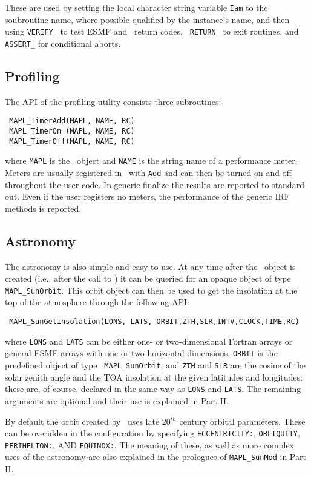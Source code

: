 These are used by setting the local character string variable {\tt Iam} to
the soubroutine name, where possible qualified by the instance's name,
and then using {\tt VERIFY\_} to test ESMF and \ggn\  return codes, {\tt
  RETURN\_} to exit routines, and {\tt  ASSERT\_} for conditional aborts. 

\subsection{Profiling}
The API of the profiling utility consists three subroutines:
\begin{verbatim}
 MAPL_TimerAdd(MAPL, NAME, RC)
 MAPL_TimerOn (MAPL, NAME, RC)
 MAPL_TimerOff(MAPL, NAME, RC)
\end{verbatim}
where {\tt MAPL} is the \ggn\  object and {\tt NAME} is the string
name of a performance meter. Meters are usually registered in \ssv\
with {\tt Add} and can then be turned on and off throughout the user
code. In generic finalize the results are reported to standard
out. Even if the user registers no meters, the performance of the
generic IRF methods is reported.

\subsection{Astronomy}
 The astronomy is also simple and easy to use. At any time after the
 \ggn\ object is created (i.e., after the call to \gssv) it can be
 queried for an opaque object of type {\tt MAPL\_SunOrbit}.
 This orbit object can
 then be used to get the insolation at the top of the atmosphere
 through the following API:
\begin{verbatim}
 MAPL_SunGetInsolation(LONS, LATS, ORBIT,ZTH,SLR,INTV,CLOCK,TIME,RC)
\end{verbatim}
  where {\tt LONS} and {\tt LATS} can be either one- or two-dimensional
  Fortran arrays or general ESMF arrays with one or two horizontal
  dimensions, {\tt ORBIT} is the predefined object of type {\tt
  MAPL\_SunOrbit}, and {\tt ZTH} and {\tt SLR} are the cosine of the solar zenith angle
  and the TOA insolation at the given latitudes and longitudes; these are,
  of course, declared in the same way as  {\tt LONS} and {\tt LATS}. The
  remaining arguments are optional and their use is explained in Part II.

  By default the orbit created by \ggn\  uses late 20$^{th}$ century
  orbital parameters. These can be
  overidden in the configuration by specifying {\tt ECCENTRICITY:},
  {\tt OBLIQUITY}, {\tt PERIHELION:}, AND {\tt EQUINOX:}. The meaning
  of these, as well as more complex uses of the astronomy are also explained
  in the prologues of {\tt MAPL\_SunMod} in Part II.

